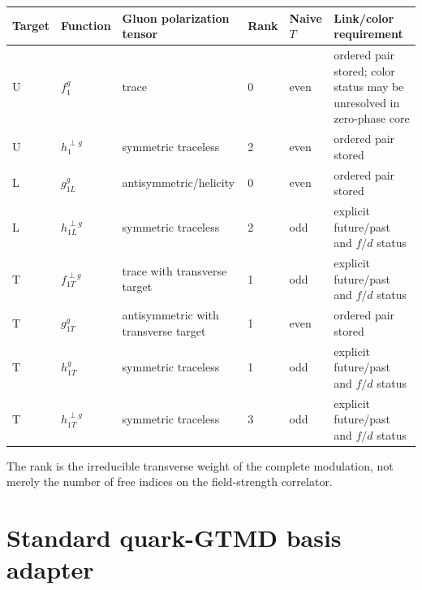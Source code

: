 \documentclass[11pt]{article}
\begin{document}
\begingroup
\setlength{\tabcolsep}{3pt}
\begin{longtable}{L{0.10\textwidth}L{0.17\textwidth}L{0.22\textwidth}L{0.08\textwidth}L{0.11\textwidth}L{0.21\textwidth}}
\toprule
Target & Function & Gluon polarization tensor & Rank & Naive \(T\) & Link/color requirement\\
\midrule
\endhead
U & \(f_1^g\) & trace & 0 & even & ordered pair stored; color status may be unresolved in zero-phase core\\
U & \(h_1^{\perp g}\) & symmetric traceless & 2 & even & ordered pair stored\\
L & \(g_{1L}^g\) & antisymmetric/helicity & 0 & even & ordered pair stored\\
L & \(h_{1L}^{\perp g}\) & symmetric traceless & 2 & odd & explicit future/past and \(f/d\) status\\
T & \(f_{1T}^{\perp g}\) & trace with transverse target & 1 & odd & explicit future/past and \(f/d\) status\\
T & \(g_{1T}^g\) & antisymmetric with transverse target & 1 & even & ordered pair stored\\
T & \(h_{1T}^{g}\) & symmetric traceless & 1 & odd & explicit future/past and \(f/d\) status\\
T & \(h_{1T}^{\perp g}\) & symmetric traceless & 3 & odd & explicit future/past and \(f/d\) status\\
\bottomrule
\end{longtable}
\endgroup
The rank is the irreducible transverse weight of the complete modulation, not
merely the number of free indices on the field-strength correlator.

\section{Standard quark-GTMD basis adapter}
\label{app:mms-adapter}
\end{document}
